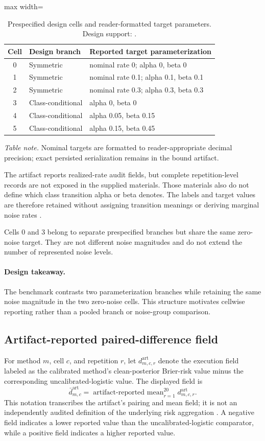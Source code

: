 \documentclass{article}
\begin{document}
\begin{table}[ht]
\centering
\caption{Prespecified design cells and reader-formatted target parameters. Design support: \cite{exec}.}
\begin{adjustbox}{max width=\linewidth}
\begin{tabular}{cll}
\toprule
Cell & Design branch & Reported target parameterization\\
\midrule
0 & Symmetric & nominal rate 0; alpha 0, beta 0\\
1 & Symmetric & nominal rate 0.1; alpha 0.1, beta 0.1\\
2 & Symmetric & nominal rate 0.3; alpha 0.3, beta 0.3\\
3 & Class-conditional & alpha 0, beta 0\\
4 & Class-conditional & alpha 0.05, beta 0.15\\
5 & Class-conditional & alpha 0.15, beta 0.45\\
\bottomrule
\end{tabular}
\end{adjustbox}
\end{table}

\noindent\textit{Table note.} Nominal targets are formatted to reader-appropriate decimal precision; exact persisted serialization remains in the bound artifact.

The artifact reports realized-rate audit fields, but complete repetition-level records are not exposed in the supplied materials. Those materials also do not define which class transition alpha or beta denotes. The labels and target values are therefore retained without assigning transition meanings or deriving marginal noise rates \cite{exec}.

Cells 0 and 3 belong to separate prespecified branches but share the same zero-noise target. They are not different noise magnitudes and do not extend the number of represented noise levels.

\paragraph{Design takeaway.} The benchmark contrasts two parameterization branches while retaining the same noise magnitude in the two zero-noise cells. This structure motivates cellwise reporting rather than a pooled branch or noise-group comparison.

\subsection{Artifact-reported paired-difference field}
For method $m$, cell $c$, and repetition $r$, let $d^{\mathrm{art}}_{m,c,r}$ denote the execution field labeled as the calibrated method's clean-posterior Brier-risk value minus the corresponding uncalibrated-logistic value. The displayed field is
\[
\bar d^{\mathrm{art}}_{m,c}
= \operatorname{artifact\text{-}reported\ mean}_{r=1}^{20}
  d^{\mathrm{art}}_{m,c,r}.
\]
This notation transcribes the artifact's pairing and mean field; it is not an independently audited definition of the underlying risk aggregation \cite{exec}. A negative field indicates a lower reported value than the uncalibrated-logistic comparator, while a positive field indicates a higher reported value.
\end{document}
